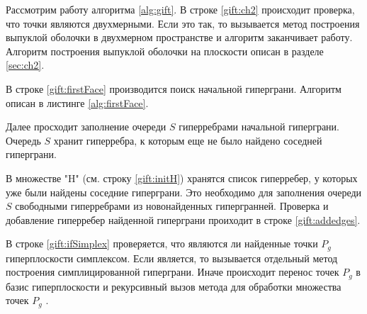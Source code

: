 \documentclass[a4paper,14pt]{extarticle}  %
\begin{document}
Рассмотрим работу алгоритма \ref{alg:gift}. В строке \ref{gift:ch2} происходит проверка, что точки являются двухмерными. Если это так, то вызывается метод построения выпуклой оболочки в двухмерном пространстве и алгоритм заканчивает работу. Алгоритм построения выпуклой оболочки на плоскости описан в разделе \ref{sec:ch2}.

В строке \ref{gift:firstFace} производится поиск начальной гиперграни. Алгоритм описан в листинге \ref{alg:firstFace}.

Далее просходит заполнение очереди $S$ гиперребрами начальной гиперграни.
Очередь $S$ хранит гиперребра, к которым еще не было найдено соседней гиперграни.

В множестве "H" (см. строку \ref{gift:initH}) хранятся список гиперребер, у которых уже были найдены соседние гиперграни. Это необходимо для заполнения очереди $S$ свободными гиперребрами из новонайденных гипергранней. Проверка и добавление гиперребер найденной гиперграни проиходит в строке \ref{gift:addedges}.

В строке \ref{gift:ifSimplex} проверяется, что являются ли найденные точки $P_g$ гиперплоскости симплексом. Если является, то вызывается отдельный метод построения симплицированной гиперграни.
Иначе происходит перенос точек $P_g$ в базис гиперплоскости и рекурсивный вызов метода для обработки множества точек $P_g$ .

\end{document}
